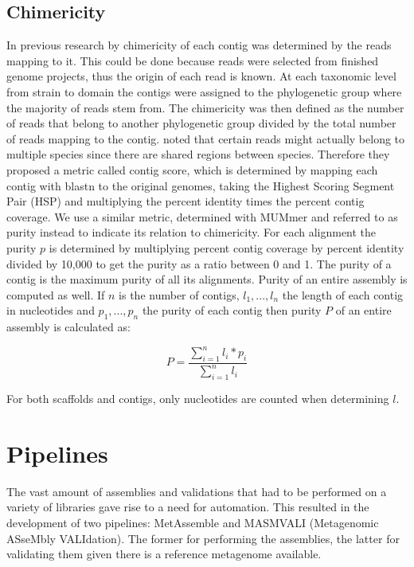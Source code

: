 \documentclass[a4paper,12pt]{report}
\begin{document}
\subsection{Chimericity}
\label{sec:chimer}
In previous research by \citet{Mavromatis17468765} chimericity of
each contig was determined by the reads mapping to it. This could be done
because reads were selected from finished genome projects, thus 
the origin of each read is known. At each taxonomic level from strain to domain the
contigs were assigned to the phylogenetic group where the majority of reads
stem from. The chimericity was then defined as the number of
reads that belong to another phylogenetic group divided by the total number of
reads mapping to the contig.  \citet{Mende22384016} noted that certain
reads might actually belong to multiple species since there are shared regions between species.
Therefore they proposed a metric called contig score, which is determined by mapping
each contig with blastn to the original genomes, taking the Highest Scoring
Segment Pair (HSP) and multiplying the percent identity times the percent
contig coverage. We use a similar metric, determined with MUMmer
and referred to as purity instead to indicate its relation to chimericity. For
each alignment the purity $p$ is determined by multiplying percent contig
coverage by percent identity divided by 10,000 to get the purity as a ratio
between 0 and 1. The purity of a contig is the maximum purity of all its
alignments. Purity of an entire assembly is computed as well. If $n$ is the
number of contigs, $l_1,...,l_n$ the length of each contig in nucleotides and
$p_1,...,p_n$ the purity of each contig then purity $P$ of an entire
assembly is calculated as:

\begin{equation}
P = \frac{\sum_{i=1}^n l_{i} * p_{i}}{\sum_{i=1}^{n} l_{i}}
\end{equation}

For both scaffolds and contigs, only nucleotides are counted when determining
$l$.\\


\section{Pipelines} The vast amount of assemblies and validations that had to be performed
on a variety of libraries gave rise to a need for automation. This resulted in
the development of two pipelines: MetAssemble and MASMVALI (Metagenomic
ASseMbly VALIdation). The former for performing the assemblies, the latter for
validating them given there is a reference metagenome available.
\end{document}
